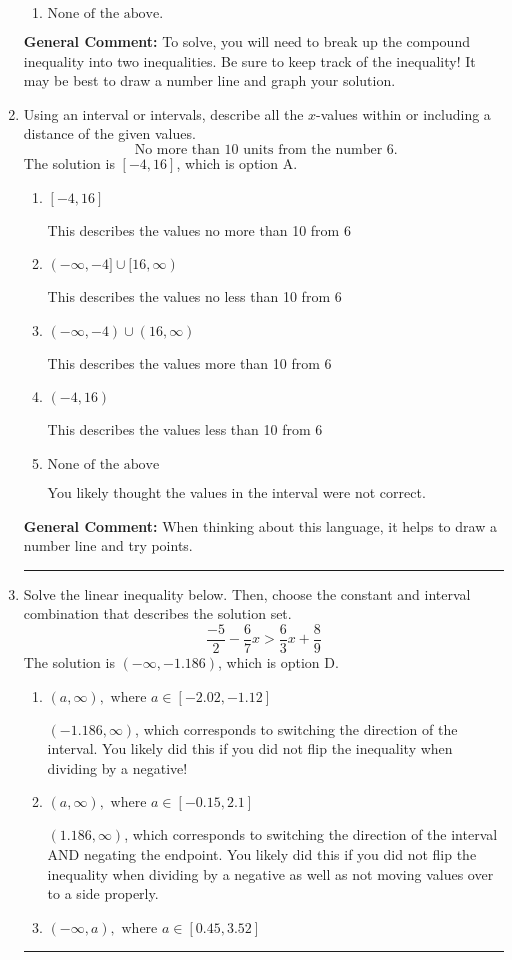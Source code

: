 \documentclass{extbook}[14pt]
\newcommand{\litem}[1]{\item #1

\rule{\textwidth}{0.4pt}}
\begin{document}
\begin{enumerate}
{\begin{enumerate}[label=\Alph*.]
* $(-1.61, 14.20]$, which is the correct option.
\item \( \text{None of the above.} \)


\end{enumerate}

\textbf{General Comment:} To solve, you will need to break up the compound inequality into two inequalities. Be sure to keep track of the inequality! It may be best to draw a number line and graph your solution.
}
\litem{
Using an interval or intervals, describe all the $x$-values within or including a distance of the given values.
\[ \text{ No more than } 10 \text{ units from the number } 6. \]The solution is \( [-4, 16] \), which is option A.\begin{enumerate}[label=\Alph*.]
\item \( [-4, 16] \)

This describes the values no more than 10 from 6
\item \( (-\infty, -4] \cup [16, \infty) \)

This describes the values no less than 10 from 6
\item \( (-\infty, -4) \cup (16, \infty) \)

This describes the values more than 10 from 6
\item \( (-4, 16) \)

This describes the values less than 10 from 6
\item \( \text{None of the above} \)

You likely thought the values in the interval were not correct.
\end{enumerate}

\textbf{General Comment:} When thinking about this language, it helps to draw a number line and try points.
}
\litem{
Solve the linear inequality below. Then, choose the constant and interval combination that describes the solution set.
\[ \frac{-5}{2} - \frac{6}{7} x > \frac{6}{3} x + \frac{8}{9} \]The solution is \( (-\infty, -1.186) \), which is option D.\begin{enumerate}[label=\Alph*.]
\item \( (a, \infty), \text{ where } a \in [-2.02, -1.12] \)

 $(-1.186, \infty)$, which corresponds to switching the direction of the interval. You likely did this if you did not flip the inequality when dividing by a negative!
\item \( (a, \infty), \text{ where } a \in [-0.15, 2.1] \)

 $(1.186, \infty)$, which corresponds to switching the direction of the interval AND negating the endpoint. You likely did this if you did not flip the inequality when dividing by a negative as well as not moving values over to a side properly.
\item \( (-\infty, a), \text{ where } a \in [0.45, 3.52] \)


\end{enumerate}}
\end{enumerate}
\end{document}
